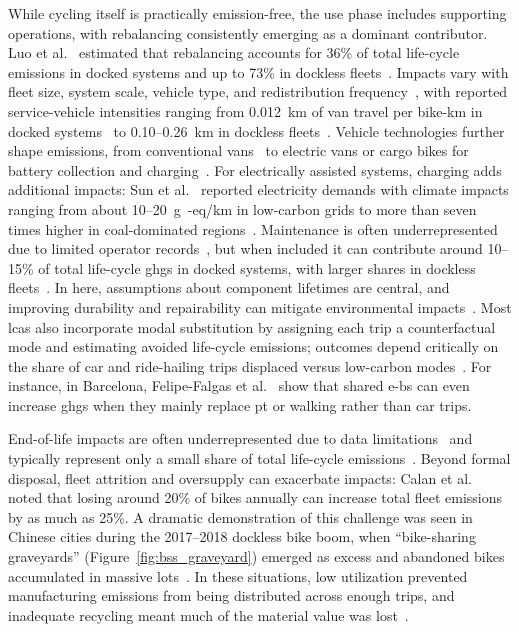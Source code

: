     While cycling itself is practically emission-free, the use phase includes supporting operations, with rebalancing consistently emerging as a dominant contributor. Luo et al.~\cite{Luo2019} estimated that rebalancing accounts for 36\% of total life-cycle emissions in docked systems and up to 73\% in dockless fleets~\cite{Luo2019}. Impacts vary with fleet size, system scale, vehicle type, and redistribution frequency~\cite{Bonilla-Alicea2020}, with reported service-vehicle intensities ranging from 0.012~km of van travel per bike-km in docked systems~\cite{Felipe-Falgas2022} to 0.10--0.26~km in dockless fleets~\cite{Sun2022, Cazzola2020}. Vehicle technologies further shape emissions, from conventional vans~\cite{Chen2020LifeCycle, Hollingsworth2019} to electric vans or cargo bikes for battery collection and charging~\cite{Felipe-Falgas2022, Calan2024}. For electrically assisted systems, charging adds additional impacts: Sun et al.~\cite{Sun2022} reported electricity demands with climate impacts ranging from about 10--20~g~-eq/km in low-carbon grids to more than seven times higher in coal-dominated regions~\cite{Zhu2023, Calan2024}.  Maintenance is often underrepresented due to limited operator records~\cite{Calan2024}, but when included it can contribute around 10--15\% of total life-cycle \acp{ghg} in docked systems, with larger shares in dockless fleets~\cite{Sun2022, Chen2024, deBortoli2021Environmental, Luo2019}. In here, assumptions about component lifetimes are central, and improving durability and repairability can mitigate environmental impacts~\cite{Zhu2023, Calan2024}. Most \acp{lca} also incorporate modal substitution by assigning each trip a counterfactual mode and estimating avoided life-cycle emissions; outcomes depend critically on the share of car and ride-hailing trips displaced versus low-carbon modes~\cite{Krauss2022}. For instance, in Barcelona, Felipe-Falgas et al.~\cite{Felipe-Falgas2022} show that shared \acp{e-b} can even increase \acp{ghg} when they mainly replace \ac{pt} or walking rather than car trips.

    End-of-life impacts are often underrepresented due to data limitations~\cite{Calan2024} and typically represent only a small share of total life-cycle emissions~\cite{Krauss2022}. Beyond formal disposal, fleet attrition and oversupply can exacerbate impacts: Calan et al.~\cite{Calan2024} noted that losing around 20\% of bikes annually can increase total fleet emissions by as much as 25\%. A dramatic demonstration of this challenge was seen in Chinese cities during the 2017--2018 dockless bike boom, when ``bike-sharing graveyards'' (Figure~\ref{fig:bss_graveyard}) emerged as excess and abandoned bikes accumulated in massive lots~\cite{Sun2022, AmusingPlanet2018}. In these situations, low utilization prevented manufacturing emissions from being distributed across enough trips, and inadequate recycling meant much of the material value was lost~\cite{Luo2019, Sun2022}.

